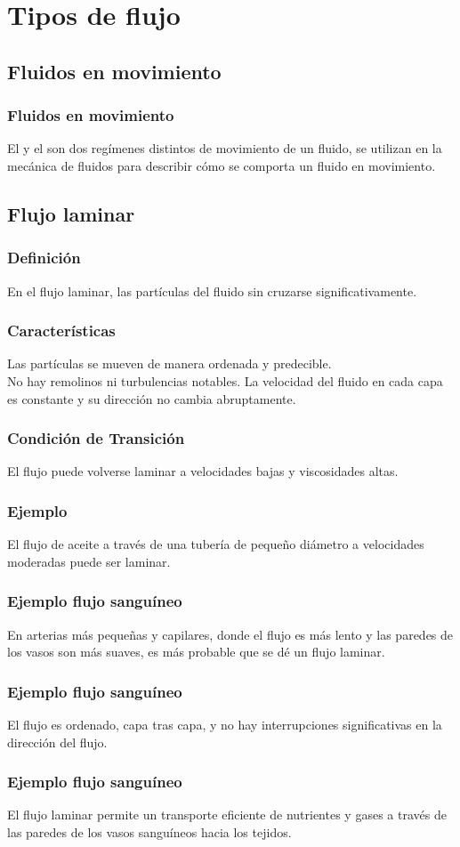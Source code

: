 \documentclass[14pt]{beamer}
\begin{document}
\section{Tipos de flujo}
\subsection{Fluidos en movimiento}

\begin{frame}
\frametitle{Fluidos en movimiento}
El  y el  son dos regímenes distintos de movimiento de un fluido, \pause se utilizan en la mecánica de fluidos para describir cómo se comporta un fluido en movimiento.
\end{frame}

\subsection{Flujo laminar} 

\begin{frame}
\frametitle{Definición}
En el flujo laminar, las partículas del fluido  sin cruzarse significativamente.
\end{frame}
\begin{frame}
\frametitle{Características} 
Las partículas se mueven de manera ordenada y predecible.
\\
\bigskip
\pause
No hay remolinos ni turbulencias notables. \pause La velocidad del fluido en cada capa es constante y su dirección no cambia abruptamente.
\end{frame}
\begin{frame}
\frametitle{Condición de Transición}
El flujo puede volverse laminar a velocidades bajas y viscosidades altas.
\end{frame}
\begin{frame}
\frametitle{Ejemplo}
El flujo de aceite a través de una tubería de pequeño diámetro a velocidades moderadas puede ser laminar.
\end{frame}
\begin{frame}
\frametitle{Ejemplo flujo sanguíneo}
En arterias más pequeñas y capilares, donde el flujo es más lento y las paredes de los vasos son más suaves, es más probable que se dé un flujo laminar.
\end{frame}
\begin{frame}
\frametitle{Ejemplo flujo sanguíneo}
El flujo es ordenado, capa tras capa, y no hay interrupciones significativas en la dirección del flujo.
\end{frame}
\begin{frame}
\frametitle{Ejemplo flujo sanguíneo}
El flujo laminar permite un transporte eficiente de nutrientes y gases a través de las paredes de los vasos sanguíneos hacia los tejidos.
\end{frame}
\end{document}
